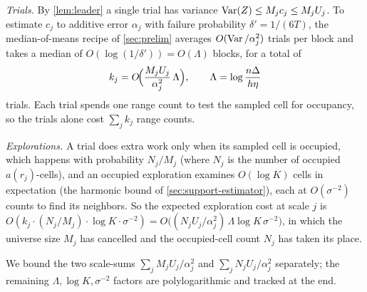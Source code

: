 \emph{Trials.} By \cref{lem:leader} a single trial has variance $\operatorname{Var}(Z)\le M_jc_j\le M_jU_j$. To estimate
$c_j$ to additive error $\alpha_j$ with failure probability $\delta'=1/(6T)$, the median-of-means recipe
of \cref{sec:prelim} averages $O(\operatorname{Var}/\alpha_j^2)$ trials per block and takes a median of $O(\log(1/\delta'))
=O(\Lambda)$ blocks, for a total of
\begin{equation}\label{eq:kj}
  k_j=O\!\Bigl(\frac{M_jU_j}{\alpha_j^2}\,\Lambda\Bigr),\qquad \Lambda=\log\frac{n\Delta}{h\eta}
\end{equation}
trials. Each trial spends one range count to test the sampled cell for occupancy, so the trials alone
cost $\sum_j k_j$ range counts.

\emph{Explorations.} A trial does extra work only when its sampled cell is occupied, which happens with
probability $N_j/M_j$ (where $N_j$ is the number of occupied $a(r_j)$-cells), and an occupied exploration
examines $O(\log K)$ cells in expectation (the harmonic bound of \cref{sec:support-estimator}), each at
$O(\sigma^{-2})$ counts to find its neighbors. So the expected exploration cost at scale $j$ is
$O(k_j\cdot(N_j/M_j)\cdot\log K\cdot\sigma^{-2})=O\bigl((N_jU_j/\alpha_j^2)\,\Lambda\log K\,\sigma^{-2}\bigr)$,
in which the universe size $M_j$ has cancelled and the occupied-cell count $N_j$ has taken its place.

We bound the two scale-sums $\sum_j M_jU_j/\alpha_j^2$ and $\sum_j N_jU_j/\alpha_j^2$ separately; the
remaining $\Lambda,\log K,\sigma^{-2}$ factors are polylogarithmic and tracked at the end.

